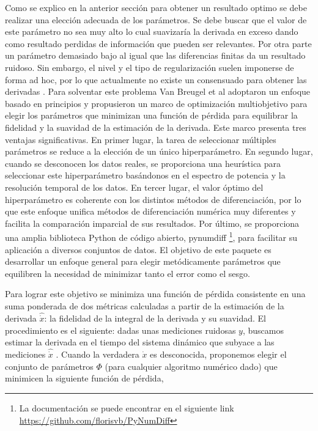 Como se explico en la anterior sección para obtener un resultado optimo se debe realizar una elección adecuada de los parámetros. Se debe buscar que el valor de este parámetro no sea muy alto  lo cual suavizaría la derivada  en exceso dando como resultado  perdidas de información que pueden ser relevantes.  Por otra parte  un parámetro demasiado bajo al igual que las diferencias finitas da un resultado  ruidoso. Sin embargo, el nivel y el tipo de regularización suelen imponerse de forma ad hoc, por lo que actualmente no existe un  consensuado para obtener las derivadas . Para solventar este problema  Van Breugel et al \cite{van_breugel_numerical_2020} adoptaron un enfoque basado en principios y propusieron  un marco de optimización multiobjetivo para elegir los parámetros que minimizan una función de pérdida para equilibrar la fidelidad y la suavidad de la estimación de la derivada. Este  marco presenta tres ventajas significativas. En primer lugar, la tarea de seleccionar múltiples parámetros se reduce a la elección de un único hiperparámetro. En segundo lugar, cuando se desconocen los datos reales, se proporciona una heurística para seleccionar este hiperparámetro basándonos en el espectro de potencia y la resolución temporal de los datos. En tercer lugar, el valor óptimo del hiperparámetro es coherente con los distintos métodos de diferenciación, por lo que este enfoque unifica métodos de diferenciación numérica muy diferentes y facilita la comparación imparcial de sus resultados. Por último, se proporciona una amplia biblioteca Python de código abierto, pynumdiff \footnote{La documentación se puede encontrar en  el siguiente link \url{https://github.com/florisvb/PyNumDiff}}, para facilitar su aplicación a diversos conjuntos de datos. El  objetivo de este paquete es desarrollar un enfoque general para elegir metódicamente parámetros que equilibren la necesidad de minimizar tanto el error como el sesgo. 

Para lograr este objetivo se minimiza una función de pérdida consistente en una suma ponderada de dos métricas calculadas a partir de la estimación de la derivada $\hat{\dot{x}}$: la fidelidad de la integral de la derivada y su suavidad. El procedimiento es el siguiente:  dadas unas mediciones ruidosas $y$, buscamos estimar la derivada en el tiempo del sistema dinámico que subyace a las mediciones $\hat{\dot{x}}$ . Cuando la verdadera $\dot{x}$ es desconocida, proponemos elegir el conjunto de parámetros $\Phi$ (para cualquier algoritmo numérico dado)   que minimicen la siguiente función de pérdida, 

